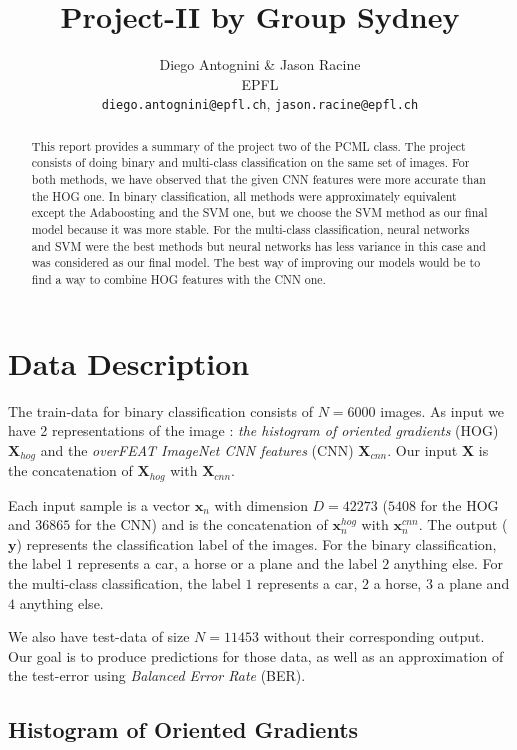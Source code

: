 \documentclass{article} %
\title{Project-II by Group Sydney}
\author{
Diego Antognini \& Jason Racine\\
EPFL \\
\texttt{diego.antognini@epfl.ch}, \texttt{jason.racine@epfl.ch} \\
}
\begin{document}
\maketitle

\begin{abstract}
This report provides a summary of the project two of the PCML class. The project consists of doing binary and multi-class classification on the same set of images. For both methods, we have observed that the given CNN features were more accurate than the HOG one. In binary classification, all methods were approximately equivalent except the Adaboosting and the SVM one, but we choose the SVM method as our final model because it was more stable. For the multi-class classification, neural networks and SVM were the best methods but neural networks has less variance in this case and was considered as our final model. The best way of improving our models would be to find a way to combine HOG features with the CNN one.

\end{abstract}

\section{Data Description}

The train-data for binary classification consists of $N = 6000$ images. As input we have 2 representations of the image : \textit{the histogram of oriented gradients} (HOG) $\mathbf{X}_{hog}$ and the \textit{overFEAT ImageNet CNN features} (CNN) $\mathbf{X}_{cnn}$. Our input $\mathbf{X}$ is the concatenation of $\mathbf{X}_{hog}$ with $\mathbf{X}_{cnn}$. 

Each input sample is a vector $\mathbf{x}_n$ with dimension $D = 42273$ ($5408$ for the HOG and $36865$ for the CNN) and is the concatenation of $\mathbf{x}_n^{hog}$ with $\mathbf{x}_n^{cnn}$.
The output ($\mathbf{y}$) represents the classification label of the images. For the binary classification, the label $1$  represents a car, a horse or a plane and the label $2$ anything else. For the multi-class classification, the label $1$ represents a car, $2$ a horse, $3$ a plane and $4$ anything else.

We also have test-data of size $N=11453$ without their corresponding output. Our goal is to produce predictions for those data, as well as an approximation of the test-error using \textit{Balanced Error Rate} (BER).

\subsection{Histogram of Oriented Gradients}
\end{document}
